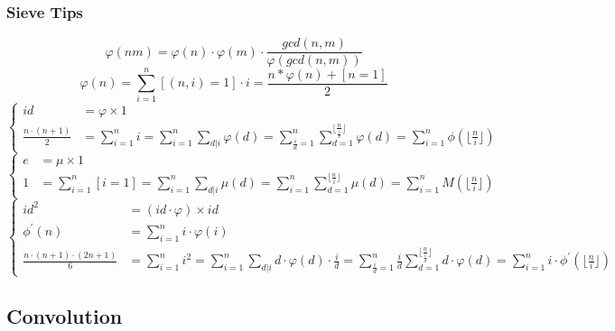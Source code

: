\documentclass[10pt]{ctexart}
\begin{document}
{{\subsubsection{Sieve Tips}
\begin{equation}
    \varphi(nm) = \varphi(n) \cdot \varphi(m) \cdot \frac{gcd(n,m)}{\varphi(gcd(n,m))}
\end{equation}
\begin{equation}
\varphi(n) = \sum_{i=1}^n[(n,i)=1]\cdot i=\frac{n* \varphi(n)+[n=1]}{2}
\end{equation}
\begin{equation}
\left\{
    \begin{aligned}
        id &= \varphi \times 1 \\
        \frac{n \cdot (n + 1)}{2} &= \sum_{i=1}^n i = \sum_{i=1}^n \sum_{d|i}\varphi(d) = \sum_{\frac{i}{d} = 1}^n \sum_{d=1}^{\lfloor\frac{n}{\frac{i}{d}}\rfloor} \varphi(d) = \sum_{i=1}^n \phi(\lfloor\frac{n}{i}\rfloor) 
    \end{aligned}
\right.
\end{equation}
\begin{equation}
\left\{
    \begin{aligned}
        e &= \mu \times 1 \\
        1 &= \sum_{i=1}^n [i=1] = \sum_{i=1}^n \sum_{d|i} \mu(d) = \sum_{i=1}^n\sum_{d=1}^{\lfloor\frac{n}{i}\rfloor} \mu(d) = \sum_{i=1}^n M(\lfloor\frac{n}{i}\rfloor)
    \end{aligned}
\right.
\end{equation}
\begin{equation}
\left\{
    \begin{aligned}
        id^2 &= (id \cdot \varphi) \times id \\
        \phi ^\prime (n) &= \sum_{i=1}^n i \cdot \varphi(i) \\
        \frac{n \cdot (n + 1) \cdot (2n + 1)}{6} &= \sum_{i=1}^n i^2 = \sum_{i=1}^n \sum_{d|i} d \cdot \varphi(d) \cdot \frac {i}{d} = \sum_{\frac{i}{d}=1}^{n} \frac{i}{d} \sum_{d=1}^{\lfloor{\frac{n}{\frac{i}{d}}}\rfloor} d \cdot \varphi(d) = \sum_{i=1}^n i \cdot \phi ^\prime (\lfloor\frac{n}{i}\rfloor)
    \end{aligned}
\right.
\end{equation}
\subsection{Convolution}
}}
\end{document}
